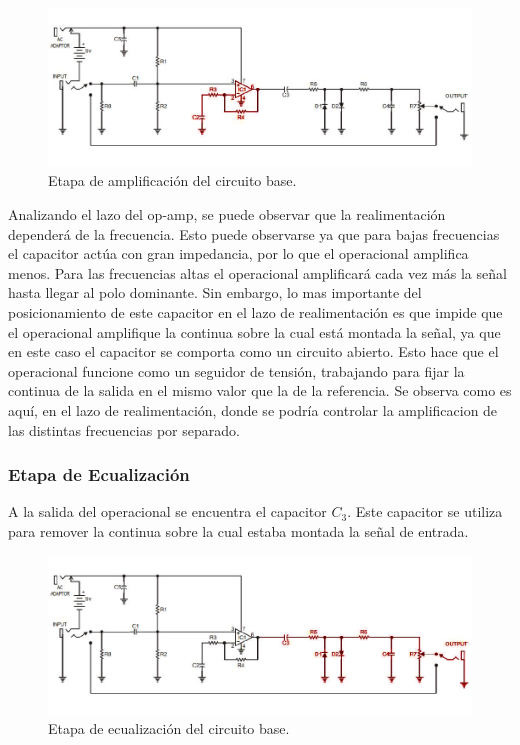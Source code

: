 \begin{figure}[H]
	\centering
	\includegraphics[width=1\textwidth, trim={0 0 0 0}, clip]{Ejercicio5/Imagenes/Circuito_base/circuito_base_amplificacion.png}
	\caption{Etapa de amplificación del circuito base.}
	\label{fig:circuito_base_amplificacion}
\end{figure}

Analizando el lazo del op-amp, se puede observar que la realimentación dependerá de la frecuencia. Esto puede observarse ya que para bajas frecuencias el capacitor actúa con gran impedancia, por lo que el operacional amplifica menos. Para las frecuencias altas el operacional amplificará cada vez más la señal hasta llegar al polo dominante. Sin embargo, lo mas importante del posicionamiento de este capacitor en el lazo de realimentación es que impide que el operacional amplifique la continua sobre la cual está montada la señal, ya que en este caso el capacitor se comporta como un circuito abierto. Esto hace que el operacional funcione como un seguidor de tensión, trabajando para fijar la continua de la salida en el mismo valor que la de la referencia. Se observa como es aquí, en el lazo de realimentación, donde se podría controlar la amplificacion de las distintas frecuencias por separado.

\subsubsection{Etapa de Ecualización}

A la salida del operacional se encuentra el capacitor $C_3$. Este capacitor se utiliza para remover la continua sobre la cual estaba montada la señal de entrada.

\begin{figure}[H]
	\centering
	\includegraphics[width=1\textwidth, trim={0 0 0 0}, clip]{Ejercicio5/Imagenes/Circuito_base/circuito_base_ecualizacion.png}
	\caption{Etapa de ecualización del circuito base.}
	\label{fig:circuito_base_ecualizacion}
\end{figure}

